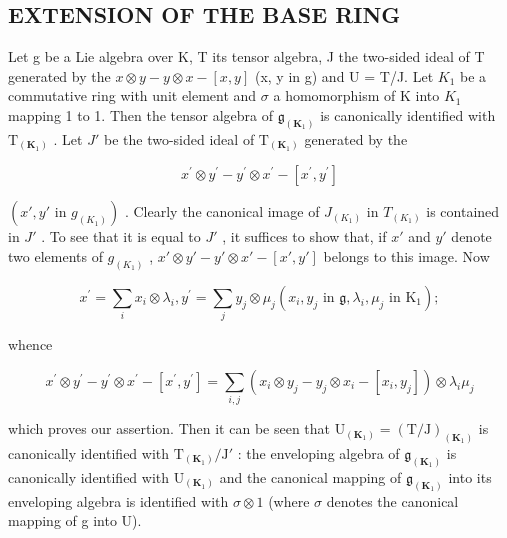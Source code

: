 \subsection{EXTENSION OF THE BASE RING}

Let g be a Lie algebra over K, T its tensor algebra, J the two-sided ideal of T generated by the \(x \otimes y - y \otimes x - [x, y]\) (x, y in g) and U = T/J. Let \(K_{1}\) be a commutative ring with unit element and \(\sigma\) a homomorphism of K into \(K_{1}\) mapping 1 to 1. Then the tensor algebra of \(\mathfrak{g}_{(\mathbf{K}_{1})}\) is canonically identified with \(\mathrm{T}_{(\mathbf{K}_{1})}\) . Let \(J'\) be the two-sided ideal of \(\mathrm{T}_{(\mathbf{K}_{1})}\) generated by the

\[
x ^ {\prime} \otimes y ^ {\prime} - y ^ {\prime} \otimes x ^ {\prime} - [ x ^ {\prime}, y ^ {\prime} ]
\]

\((x', y' \text{ in } g_{(K_1)})\) . Clearly the canonical image of \(J_{(K_1)}\) in \(T_{(K_1)}\) is contained in \(J'\) . To see that it is equal to \(J'\) , it suffices to show that, if \(x'\) and \(y'\) denote two elements of \(g_{(K_1)}\) , \(x' \otimes y' - y' \otimes x' - [x', y']\) belongs to this image. Now

\[
x ^ {\prime} = \sum_ {i} x _ {i} \otimes \lambda_ {i}, y ^ {\prime} = \sum_ {j} y _ {j} \otimes \mu_ {j} (x _ {i}, y _ {j} \text {   in   } \mathfrak {g}, \lambda_ {i}, \mu_ {j} \text {   in   } \mathrm{K} _ {1});
\]

whence

\[
x ^ {\prime} \otimes y ^ {\prime} - y ^ {\prime} \otimes x ^ {\prime} - [ x ^ {\prime}, y ^ {\prime} ] = \sum_ {i, j} (x _ {i} \otimes y _ {j} - y _ {j} \otimes x _ {i} - [ x _ {i}, y _ {j} ]) \otimes \lambda_ {i} \mu_ {j}
\]

which proves our assertion. Then it can be seen that \(\mathrm{U}_{(\mathbf{K}_{1})} = (\mathrm{T}/\mathrm{J})_{(\mathbf{K}_{1})}\) is canonically identified with \(\mathrm{T}_{(\mathbf{K}_{1})}/\mathrm{J}'\) : the enveloping algebra of \(\mathfrak{g}_{(\mathbf{K}_{1})}\) is canonically identified with \(\mathrm{U}_{(\mathbf{K}_{1})}\) and the canonical mapping of \(\mathfrak{g}_{(\mathbf{K}_{1})}\) into its enveloping algebra is identified with \(\sigma \otimes 1\) (where \(\sigma\) denotes the canonical mapping of g into U).

